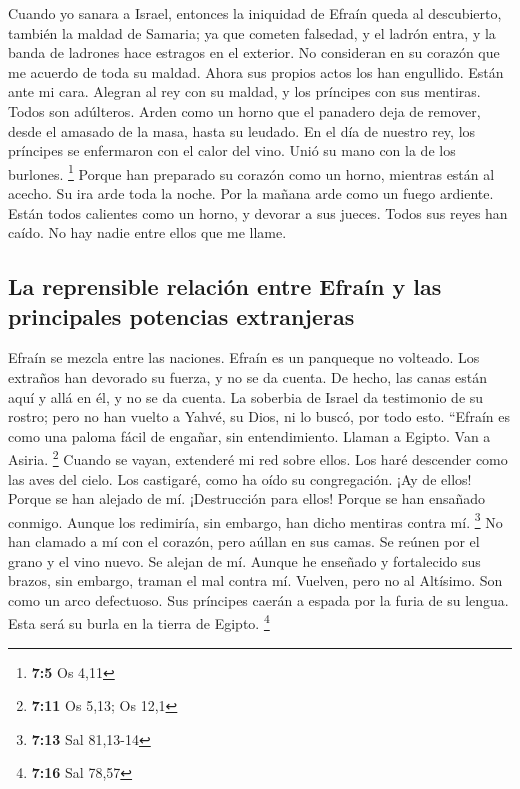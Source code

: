 \begin{paracol}{2}
 Cuando yo sanara a Israel, entonces la iniquidad de
Efraín queda al descubierto, también la maldad de Samaria; ya que
cometen falsedad, y el ladrón entra, y la banda de ladrones hace
estragos en el exterior.  No consideran en su corazón que
me acuerdo de toda su maldad. Ahora sus propios actos los han engullido.
Están ante mi cara.  Alegran al rey con su maldad, y los
príncipes con sus mentiras.  Todos son adúlteros. Arden
como un horno que el panadero deja de remover, desde el amasado de la
masa, hasta su leudado.  En el día de nuestro rey, los
príncipes se enfermaron con el calor del vino. Unió su mano con la de
los burlones. \footnote{\textbf{7:5} Os 4,11}  Porque han
preparado su corazón como un horno, mientras están al acecho. Su ira
arde toda la noche. Por la mañana arde como un fuego ardiente.
 Están todos calientes como un horno, y devorar a sus
jueces. Todos sus reyes han caído. No hay nadie entre ellos que me
llame.

\hypertarget{la-reprensible-relaciuxf3n-entre-efrauxedn-y-las-principales-potencias-extranjeras}{%
\subsection{La reprensible relación entre Efraín y las principales
potencias
extranjeras}\label{la-reprensible-relaciuxf3n-entre-efrauxedn-y-las-principales-potencias-extranjeras}}

 Efraín se mezcla entre las naciones. Efraín es un
panqueque no volteado.  Los extraños han devorado su
fuerza, y no se da cuenta. De hecho, las canas están aquí y allá en él,
y no se da cuenta.  La soberbia de Israel da testimonio
de su rostro; pero no han vuelto a Yahvé, su Dios, ni lo buscó, por todo
esto.  ``Efraín es como una paloma fácil de engañar, sin
entendimiento. Llaman a Egipto. Van a Asiria. \footnote{\textbf{7:11} Os
  5,13; Os 12,1}  Cuando se vayan, extenderé mi red sobre
ellos. Los haré descender como las aves del cielo. Los castigaré, como
ha oído su congregación.  ¡Ay de ellos! Porque se han
alejado de mí. ¡Destrucción para ellos! Porque se han ensañado conmigo.
Aunque los redimiría, sin embargo, han dicho mentiras contra mí.
\footnote{\textbf{7:13} Sal 81,13-14}  No han clamado a
mí con el corazón, pero aúllan en sus camas. Se reúnen por el grano y el
vino nuevo. Se alejan de mí.  Aunque he enseñado y
fortalecido sus brazos, sin embargo, traman el mal contra mí.
 Vuelven, pero no al Altísimo. Son como un arco
defectuoso. Sus príncipes caerán a espada por la furia de su lengua.
Esta será su burla en la tierra de Egipto. \footnote{\textbf{7:16} Sal
  78,57}


\end{paracol}
